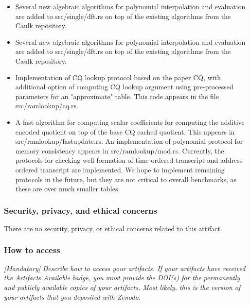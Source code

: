 \documentclass[sigconf]{acmart}
\begin{document}
	\begin{itemize}
		\item Several new algebraic algorithms for polynomial interpolation and evaluation are added to src/single/dft.rs on top of the existing algorithms from the Caulk repository.
		
		\item Several new algebraic algorithms for polynomial interpolation and evaluation are added to src/single/dft.rs on top of the existing algorithms from the Caulk repository.
		
		\item Implementation of CQ lookup protocol based on the paper CQ, with additional option of computing CQ lookup argument using pre-processed parameters for an "approximate" table. This code appears in the file src/ramlookup/cq.rs.
		
		\item A fast algorithm for computing scalar coefficients for computing the additive encoded quotient on top of the base CQ cached quotient. This appears in src/ramlookup/fastupdate.rs.
		An implementation of polynomial protocol for memory consistency appears in src/ramlookup/mod.rs. Currently, the protocols for checking well formation of time ordered transcript and address ordered transcript are implemented. We hope to implement remaining protocols in the future, but they are not critical to overall benchmarks, as these are over much smaller tables.
	\end{itemize}
	

	
	

	
	
	\subsubsection{Security, privacy, and ethical concerns}
	
	There are no security, privacy, or ethical concerns related to this artifact. 
	
	
	\subsubsection{How to access}
	
	\emph{[Mandatory]}
	\emph{Describe how to access your artifacts.  If your artifacts have
		received the \emph{Artifacts Available} badge, you must provide the
		DOI(s) for the permanently and publicly available copies of your
		artifacts.  Most likely, this is the version of your artifacts that
		you deposited with Zenodo.}
	
\end{document}
